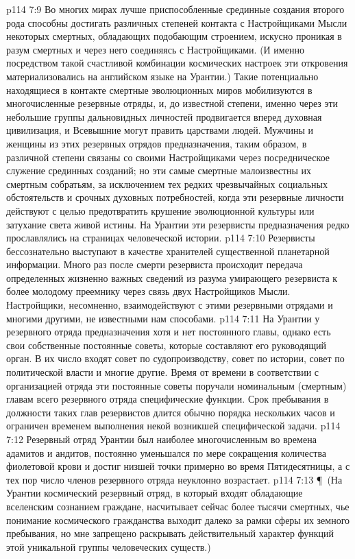 \vs p114 7:9 Во многих мирах лучше приспособленные срединные создания второго рода способны достигать различных степеней контакта с Настройщиками Мысли некоторых смертных, обладающих подобающим строением, искусно проникая в разум смертных и через него соединяясь с Настройщиками. (И именно посредством такой счастливой комбинации космических настроек эти откровения материализовались на английском языке на Урантии.) Такие потенциально находящиеся в контакте смертные эволюционных миров мобилизуются в многочисленные резервные отряды, и, до известной степени, именно через эти небольшие группы дальновидных личностей продвигается вперед духовная цивилизация, и Всевышние могут править царствами людей. Мужчины и женщины из этих резервных отрядов предназначения, таким образом, в различной степени связаны со своими Настройщиками через посредническое служение срединных созданий; но эти самые смертные малоизвестны их смертным собратьям, за исключением тех редких чрезвычайных социальных обстоятельств и срочных духовных потребностей, когда эти резервные личности действуют с целью предотвратить крушение эволюционной культуры или затухание света живой истины. На Урантии эти резервисты предназначения редко прославлялись на страницах человеческой истории.
\vs p114 7:10 Резервисты бессознательно выступают в качестве хранителей существенной планетарной информации. Много раз после смерти резервиста происходит передача определенных жизненно важных сведений из разума умирающего резервиста к более молодому преемнику через связь двух Настройщиков Мысли. Настройщики, несомненно, взаимодействуют с этими резервными отрядами и многими другими, не известными нам способами.
\vs p114 7:11 На Урантии у резервного отряда предназначения хотя и нет постоянного главы, однако есть свои собственные постоянные советы, которые составляют его руководящий орган. В их число входят совет по судопроизводству, совет по истории, совет по политической власти и многие другие. Время от времени в соответствии с организацией отряда эти постоянные советы поручали номинальным (смертным) главам всего резервного отряда специфические функции. Срок пребывания в должности таких глав резервистов длится обычно порядка нескольких часов и ограничен временем выполнения некой возникшей специфической задачи.
\vs p114 7:12 Резервный отряд Урантии был наиболее многочисленным во времена адамитов и андитов, постоянно уменьшался по мере сокращения количества фиолетовой крови и достиг низшей точки примерно во время Пятидесятницы, а с тех пор число членов резервного отряда неуклонно возрастает.
\vs p114 7:13 \P\ (На Урантии космический резервный отряд, в который входят обладающие вселенским сознанием граждане, насчитывает сейчас более тысячи смертных, чье понимание космического гражданства выходит далеко за рамки сферы их земного пребывания, но мне запрещено раскрывать действительный характер функций этой уникальной группы человеческих существ.)
